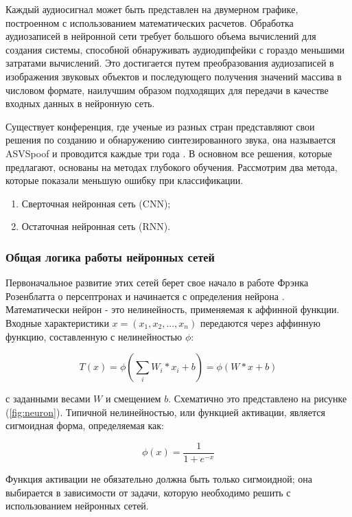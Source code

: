 Каждый аудиосигнал может быть представлен на двумерном графике, построенном с использованием математических расчетов. Обработка аудиозаписей в нейронной сети требует большого объема вычислений для создания системы, способной обнаруживать аудиодипфейки с гораздо меньшими затратами вычислений. Это достигается путем преобразования аудиозаписей в изображения звуковых объектов и последующего получения значений массива в числовом формате, наилучшим образом подходящих для передачи в качестве входных данных в нейронную сеть.

Существует конференция, где ученые из разных стран представляют свои решения по созданию и обнаружению синтезированного звука, она называется ASVSpoof и проводится каждые три года \cite{yamagishi2021asvspoof}. В основном все решения, которые предлагают, основаны на методах глубокого обучения. Рассмотрим два метода, которые показали меньшую ошибку при классификации.
\begin{enumerate}
    \item Сверточная нейронная сеть (CNN);
    \item Остаточная нейронная сеть (RNN).
\end{enumerate}

\subsubsection{Общая логика работы нейронных сетей}

Первоначальное развитие этих сетей берет свое начало в работе Фрэнка Розенблатта о персептронах и начинается с определения нейрона \cite{DOU2023484}. Математически нейрон - это нелинейность, применяемая к аффинной функции. Входные характеристики \(x = (x_1, x_2, . . . , x_n)\) передаются через аффинную функцию, составленную с нелинейностью \(\phi\):

\[
    T(x) = \phi\left(\sum_{i} W_{i} \ast x_{i} + b\right) = \phi(W \ast x + b)
\]

с заданными весами \(W\) и смещением \(b\). Схематично это представлено на рисунке (\ref{fig:neuron}). Типичной нелинейностью, или функцией активации, является сигмоидная форма, определяемая как:

\[
    \phi(x) = \frac{1}{1 + e^{-x}}
\]

Функция активации не обязательно должна быть только сигмоидной; она выбирается в зависимости от задачи, которую необходимо решить с использованием нейронных сетей.

